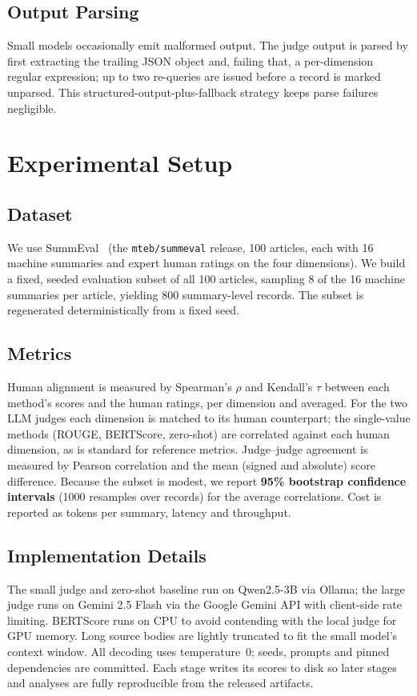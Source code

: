 \documentclass[runningheads]{llncs}
\begin{document}
\subsection{Output Parsing}
Small models occasionally emit malformed output. The judge output is parsed by first
extracting the trailing JSON object and, failing that, a per-dimension regular
expression; up to two re-queries are issued before a record is marked unparsed.
This structured-output-plus-fallback strategy keeps parse failures negligible.

\section{Experimental Setup}

\subsection{Dataset}
We use SummEval~\cite{fabbri2021summeval} (the \texttt{mteb/summeval} release, 100
articles, each with 16 machine summaries and expert human ratings on the four
dimensions). We build a fixed, seeded evaluation subset of all 100 articles,
sampling 8 of the 16 machine summaries per article, yielding 800 summary-level
records. The subset is regenerated deterministically from a fixed seed.

\subsection{Metrics}
Human alignment is measured by Spearman's $\rho$ and Kendall's $\tau$ between each
method's scores and the human ratings, per dimension and averaged. For the two LLM
judges each dimension is matched to its human counterpart; the single-value methods
(ROUGE, BERTScore, zero-shot) are correlated against each human dimension, as is
standard for reference metrics. Judge--judge agreement is measured by Pearson
correlation and the mean (signed and absolute) score difference. Because the subset
is modest, we report \textbf{95\% bootstrap confidence intervals} (1000 resamples
over records) for the average correlations. Cost is reported as tokens per summary,
latency and throughput.

\subsection{Implementation Details}\label{sec:impl}
The small judge and zero-shot baseline run on Qwen2.5-3B via Ollama; the large judge
runs on Gemini 2.5 Flash via the Google Gemini API with client-side rate limiting. BERTScore runs on CPU
to avoid contending with the local judge for GPU memory. Long source bodies are
lightly truncated to fit the small model's context window. All decoding uses
temperature~0; seeds, prompts and pinned dependencies are committed. Each stage
writes its scores to disk so later stages and analyses are fully reproducible from
the released artifacts.
\end{document}
